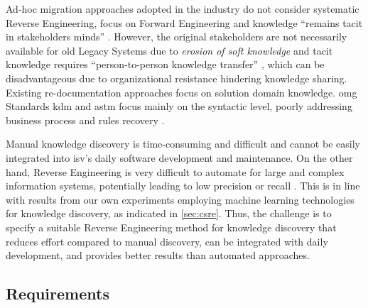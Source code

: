 Ad-hoc migration approaches adopted in the industry do not consider systematic \gls{Reverse Engineering}, focus on \gls{Forward Engineering} and knowledge ``remains tacit in stakeholders minds'' \autocite{Razavian2012}.
However, the original stakeholders are not necessarily available for old \glspl{Legacy System} due to \emph{erosion of soft knowledge} \autocite{Khadka2014ProfessionalsModernization} and tacit knowledge requires ``person-to-person knowledge transfer'' \autocite{Razavian2012}, which
can be disadvantageous due to organizational resistance \autocite{Khadka2014ProfessionalsModernization} hindering knowledge sharing.
Existing re-documentation approaches focus on solution domain knowledge. %
\gls{omg} Standards \gls{kdm} and \gls{astm} focus mainly on the syntactic level, poorly addressing business process and rules recovery \autocite{Mohagheghi2011REMICS}.
\vspace*{-5pt}

Manual knowledge discovery is time-consuming and difficult \autocite{Khadka2014ProfessionalsModernization,Batlajery2014IndustrialSurveyModernization} and cannot be easily integrated into \gls{isv}'s daily software development and maintenance.
On the other hand, \gls{Reverse Engineering} is very difficult to automate for large and complex information systems, potentially leading to low precision or recall \autocite{Canfora2007ReverseEngineering}.
This is in line with results from our own experiments employing machine learning technologies for knowledge discovery, as indicated in \cref{sec:csre}.
Thus, the challenge is to specify a suitable \gls{Reverse Engineering} method for knowledge discovery that reduces effort compared to manual discovery, can be integrated with daily development, and provides better results than automated approaches.

\hypertarget{sec:re.requirements}{%
\subsection{Requirements}\label{sec:re.requirements}}
\vspace{5pt}

